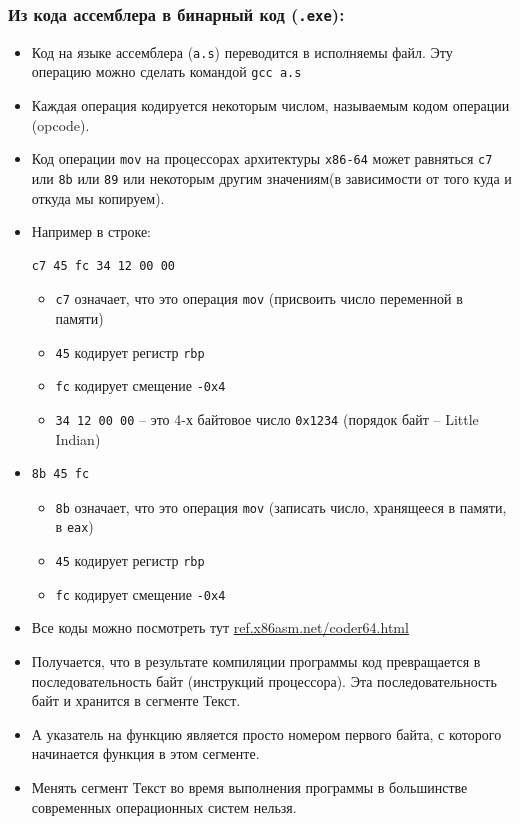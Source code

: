 \documentclass{article}
\begin{document}
\subsubsection*{Из кода ассемблера в бинарный код (\texttt{.exe}):}
\begin{itemize}
\item Код на языке ассемблера (\texttt{a.s}) переводится в исполняемы файл. Эту операцию можно сделать командой \texttt{gcc a.s}
\item Каждая операция кодируется некоторым числом, называемым кодом операции (opcode).
\item Код операции \texttt{mov} на процессорах архитектуры \texttt{x86-64} может равняться \texttt{с7} или \texttt{8b} или \texttt{89} или некоторым другим  значениям(в зависимости от того куда и откуда мы копируем).
\item Например в строке:
\begin{verbatim}
c7 45 fc 34 12 00 00
\end{verbatim}
\begin{itemize}
\item \texttt{с7} означает, что это операция \texttt{mov} (присвоить число переменной в памяти)
\item \texttt{45} кодирует регистр \texttt{rbp}
\item \texttt{fc} кодирует смещение \texttt{-0x4}
\item \texttt{34 12 00 00} -- это 4-х байтовое число \texttt{0x1234} (порядок байт -- Little Indian)
\end{itemize}

\item
\begin{verbatim}
8b 45 fc
\end{verbatim}
\begin{itemize}
\item \texttt{8b} означает, что это операция \texttt{mov} (записать число, хранящееся в памяти, в \texttt{eax})
\item \texttt{45} кодирует регистр \texttt{rbp}
\item \texttt{fc} кодирует смещение \texttt{-0x4}
\end{itemize}

\item Все коды можно посмотреть тут \href{http://ref.x86asm.net/coder64.html}{ref.x86asm.net/coder64.html}
\item Получается, что в результате компиляции программы код превращается в последовательность байт (инструкций процессора). Эта последовательность байт и хранится в сегменте Текст.
\item А указатель на функцию является просто номером первого байта, с которого начинается функция в этом сегменте.
\item Менять сегмент Текст во время выполнения программы в большинстве современных операционных систем нельзя. 
\end{itemize}
\end{document}
